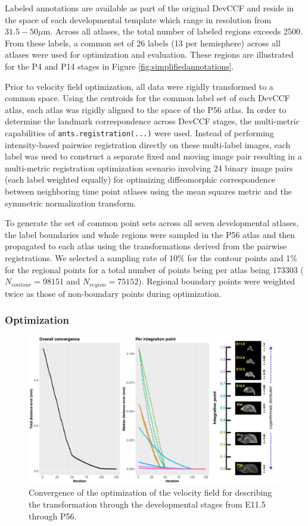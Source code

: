 \documentclass[
  12pt,
]{article}
\begin{document}
Labeled annotations are available as part of the original DevCCF and
reside in the space of each developmental template which range in
resolution from \(31.5-50 \mu\)m. Across all atlases, the total number
of labeled regions exceeds 2500. From these labels, a common set of 26
labels (13 per hemisphere) across all atlases were used for optimization
and evaluation. These regions are illustrated for the P4 and P14 stages
in Figure \ref{fig:simplifiedannotations}.

Prior to velocity field optimization, all data were rigidly transformed
to a common space. Using the centroids for the common label set of each
DevCCF atlas, each atlas was rigidly aligned to the space of the P56
atlas. In order to determine the landmark correspondence across DevCCF
stages, the multi-metric capabilities of \texttt{ants.registration(...)}
were used. Instead of performing intensity-based pairwise registration
directly on these multi-label images, each label was used to construct a
separate fixed and moving image pair resulting in a multi-metric
registration optimization scenario involving 24 binary image pairs (each
label weighted equally) for optimizing diffeomorphic correspondence
between neighboring time point atlases using the mean squares metric and
the symmetric normalization transform.

To generate the set of common point sets across all seven developmental
atlases, the label boundaries and whole regions were sampled in the P56
atlas and then propagated to each atlas using the transformations
derived from the pairwise registrations. We selected a sampling rate of
10\% for the contour points and 1\% for the regional points for a total
number of points being per atlas being \(173303\)
(\(N_{contour} = 98151\) and \(N_{region}=75152\)). Regional boundary
points were weighted twice as those of non-boundary points during
optimization.

\hypertarget{optimization}{%
\subsubsection{Optimization}\label{optimization}}

\begin{figure}[!htb]
\centering
\includegraphics[width=0.99\textwidth]{Figures/convergence.pdf}
\caption{Convergence of the optimization of the velocity field for describing the 
transformation through the developmental stages from E11.5 through P56.}
\label{fig:convergence}
\end{figure}
\end{document}
